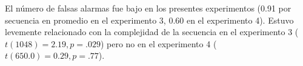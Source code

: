 
El número de falsas alarmas fue bajo en los presentes experimentos (0.91 por secuencia en promedio en el experimento 3, 0.60 en el experimento 4). Estuvo levemente relacionado con la complejidad de la secuencia en el experimento 3 ($t (1048) = 2.19, p= .029$) pero no en el experimento 4 ($t (650.0) = 0. 29, p = . 77$).

